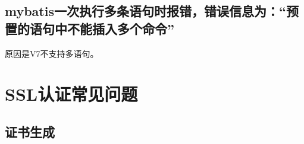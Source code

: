 \documentclass[letterpaper,10pt,english]{sphinxmanual}
\begin{document}
\subsection{mybatis一次执行多条语句时报错，错误信息为：“预置的语句中不能插入多个命令”}
\label{\detokenize{interface/jdbc-v7:mybatis}}
原因是V7不支持多语句。


\section{SSL认证常见问题}
\label{\detokenize{interface/SSL:ssl}}\label{\detokenize{interface/SSL:id1}}\label{\detokenize{interface/SSL::doc}}

\subsection{证书生成}
\label{\detokenize{interface/SSL:id2}}
\end{document}

